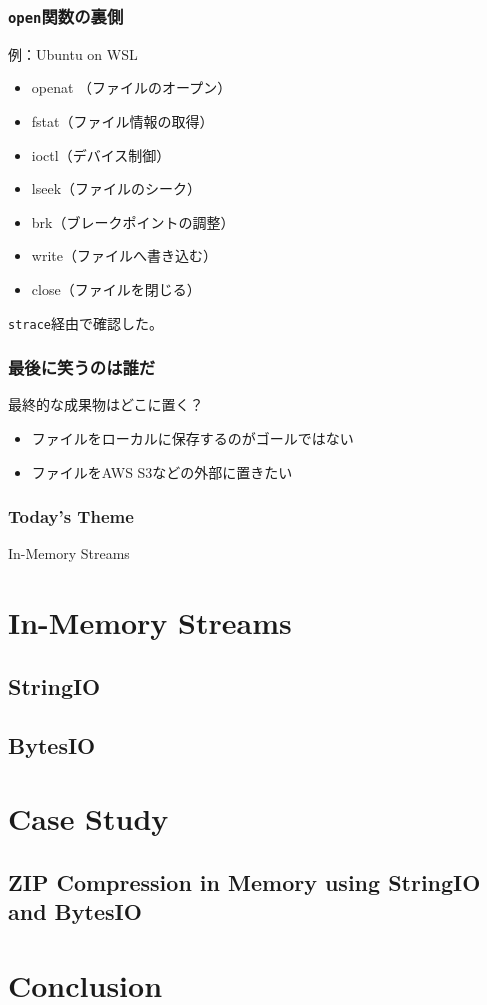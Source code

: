 \documentclass[dvipdfmx,12pt,notheorems]{beamer}
\theoremstyle{definition}
\begin{document}
\begin{frame}[fragile]\frametitle{\texttt{open}関数の裏側}

\begin{exampleblock}{例：Ubuntu on WSL}
\begin{itemize}
\item openat （ファイルのオープン）
\item fstat（ファイル情報の取得）
\item ioctl（デバイス制御）
\item lseek（ファイルのシーク）
\item brk（ブレークポイントの調整）
\item write（ファイルへ書き込む）
\item close（ファイルを閉じる）
\end{itemize}
\end{exampleblock}
\texttt{strace}経由で確認した。

\end{frame}

\begin{frame}\frametitle{最後に笑うのは誰だ}
\begin{block}{最終的な成果物はどこに置く？}
\begin{itemize}
\item ファイルをローカルに保存するのがゴールではない
\item ファイルをAWS S3などの外部に置きたい
\end{itemize}
\end{block}
\end{frame}

\begin{frame}\frametitle{Today's Theme}
\begin{center}
\huge{In-Memory Streams}
\end{center}
\end{frame}

\section{In-Memory Streams}

\subsection{StringIO}

\subsection{BytesIO}

\section{Case Study}

\subsection{ZIP Compression in Memory using StringIO and BytesIO}

\section{Conclusion}
\end{document}
